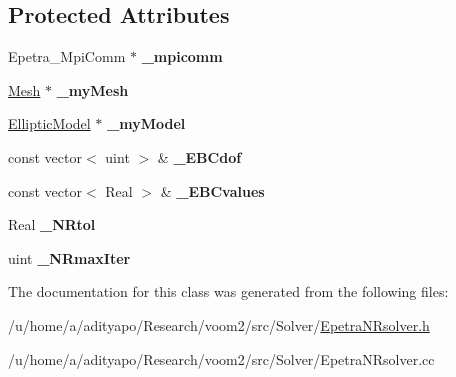 \subsection*{Protected Attributes}
\begin{DoxyCompactItemize}
\item 
\hypertarget{classvoom_1_1_epetra_n_rsolver_a6a99fbbaa2940bbf07dc3b9d3015af54}{
Epetra\_\-MpiComm $\ast$ {\bfseries \_\-mpicomm}}
\label{classvoom_1_1_epetra_n_rsolver_a6a99fbbaa2940bbf07dc3b9d3015af54}

\item 
\hypertarget{classvoom_1_1_epetra_n_rsolver_ae6fae2326e4484ba1679872c318bf870}{
\hyperlink{classvoom_1_1_mesh}{Mesh} $\ast$ {\bfseries \_\-myMesh}}
\label{classvoom_1_1_epetra_n_rsolver_ae6fae2326e4484ba1679872c318bf870}

\item 
\hypertarget{classvoom_1_1_epetra_n_rsolver_a684645af12f7c7616220e04def39b5a9}{
\hyperlink{classvoom_1_1_elliptic_model}{EllipticModel} $\ast$ {\bfseries \_\-myModel}}
\label{classvoom_1_1_epetra_n_rsolver_a684645af12f7c7616220e04def39b5a9}

\item 
\hypertarget{classvoom_1_1_epetra_n_rsolver_a33db401ded52b5c31a658f73a59a0676}{
const vector$<$ uint $>$ \& {\bfseries \_\-EBCdof}}
\label{classvoom_1_1_epetra_n_rsolver_a33db401ded52b5c31a658f73a59a0676}

\item 
\hypertarget{classvoom_1_1_epetra_n_rsolver_a192734341c10256dbb7224781201ed92}{
const vector$<$ Real $>$ \& {\bfseries \_\-EBCvalues}}
\label{classvoom_1_1_epetra_n_rsolver_a192734341c10256dbb7224781201ed92}

\item 
\hypertarget{classvoom_1_1_epetra_n_rsolver_abdafbed36dea7a067ad04e1341f87757}{
Real {\bfseries \_\-NRtol}}
\label{classvoom_1_1_epetra_n_rsolver_abdafbed36dea7a067ad04e1341f87757}

\item 
\hypertarget{classvoom_1_1_epetra_n_rsolver_a7937cc5479f86c2f7b1907e55a66bc0f}{
uint {\bfseries \_\-NRmaxIter}}
\label{classvoom_1_1_epetra_n_rsolver_a7937cc5479f86c2f7b1907e55a66bc0f}

\end{DoxyCompactItemize}


The documentation for this class was generated from the following files:\begin{DoxyCompactItemize}
\item 
/u/home/a/adityapo/Research/voom2/src/Solver/\hyperlink{_epetra_n_rsolver_8h}{EpetraNRsolver.h}\item 
/u/home/a/adityapo/Research/voom2/src/Solver/EpetraNRsolver.cc\end{DoxyCompactItemize}
